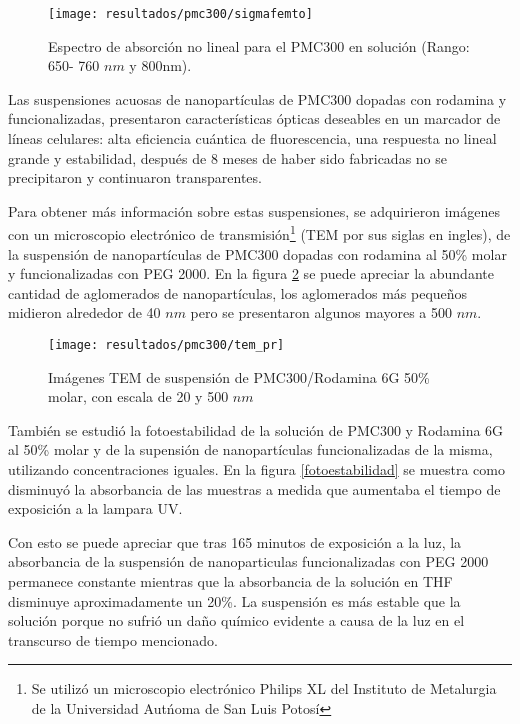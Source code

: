 \begin{figure}[H]
\centering
\texttt{[image: resultados/pmc300/sigmafemto]}
\caption{Espectro de absorci\'on no lineal para el PMC300 en soluci\'on (Rango: 650- 760 $nm$ y 800nm).\label{tpafs}}
\end{figure}
%

Las suspensiones acuosas de nanopart\'iculas de PMC300 dopadas con rodamina y funcionalizadas, presentaron caracter\'isticas \'opticas deseables en un marcador de l\'ineas celulares: alta eficiencia cu\'antica de fluorescencia, una respuesta no lineal grande y estabilidad, despu\'es de 8 meses de haber sido fabricadas no se precipitaron y continuaron transparentes. 

Para obtener m\'as informaci\'on sobre estas suspensiones, se adquirieron im\'agenes con un microscopio electr\'onico de transmisi\'on\footnote{Se utiliz\'o un microscopio electr\'onico Philips XL del Instituto de Metalurgia de la Universidad Aut\'noma de San Luis Potos\'i} (TEM por sus siglas en ingles), de la suspensi\'on de nanopart\'iculas de PMC300 dopadas con rodamina al 50\% molar y funcionalizadas con PEG 2000. En la figura \ref{temi2} se puede apreciar la abundante cantidad de aglomerados de nanopart\'iculas, los aglomerados m\'as peque\~{n}os midieron alrededor de 40 $nm$ pero se presentaron algunos mayores a 500 $nm$. 



\begin{figure}[H]
\centering
\texttt{[image: resultados/pmc300/tem\_pr]}
\caption{Im\'agenes TEM de suspensi\'on de PMC300/Rodamina 6G 50\% molar, con escala de 20 y 500 $nm$}\label{temi2}
\end{figure}

Tambi\'en se estudi\'o la fotoestabilidad de la soluci\'on de PMC300 y Rodamina 6G al 50\% molar y de la supensi\'on de nanopart\'iculas funcionalizadas de la misma, utilizando concentraciones iguales. En la figura \ref{fotoestabilidad} se muestra como disminuy\'o la absorbancia de las muestras a medida que aumentaba el tiempo de exposici\'on a la lampara UV.

Con esto se puede apreciar que tras 165 minutos de exposici\'on a la luz, la absorbancia de la suspensi\'on de nanoparticulas funcionalizadas con PEG 2000 permanece constante mientras que la absorbancia de la soluci\'on en THF disminuye aproximadamente un 20\%. La suspensi\'on es m\'as estable que la soluci\'on porque no sufri\'o un da\~{n}o qu\'imico evidente a causa de la luz en el transcurso de tiempo mencionado.






